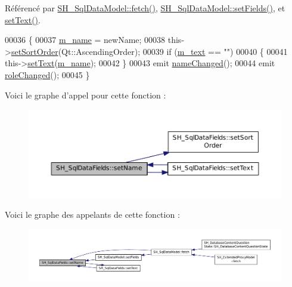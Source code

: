 Référencé par \hyperlink{classSH__SqlDataModel_ab6c206088250a66ddc8cb8d33a38e421}{S\-H\-\_\-\-Sql\-Data\-Model\-::fetch()}, \hyperlink{classSH__SqlDataModel_ad297d359375d55e66493ce8935f8ff05}{S\-H\-\_\-\-Sql\-Data\-Model\-::set\-Fields()}, et \hyperlink{classSH__SqlDataFields_ae098408de73ecbd532de8f44dea2b6d0}{set\-Text()}.


\begin{DoxyCode}
00036 \{
00037     \hyperlink{classSH__SqlDataFields_a3c0e82a8b6652335bdc53b211d39d4e2}{m\_name} = newName;
00038     this->\hyperlink{classSH__SqlDataFields_a32a7c040a081d39594245e1a4a68f70d}{setSortOrder}(Qt::AscendingOrder);
00039     \textcolor{keywordflow}{if} (\hyperlink{classSH__SqlDataFields_a55352d3aea0863fcab26c948babe8523}{m\_text} == \textcolor{stringliteral}{""})
00040     \{
00041         this->\hyperlink{classSH__SqlDataFields_ae098408de73ecbd532de8f44dea2b6d0}{setText}(\hyperlink{classSH__SqlDataFields_a3c0e82a8b6652335bdc53b211d39d4e2}{m\_name});
00042     \}
00043     emit \hyperlink{classSH__SqlDataFields_a2769afd59dde74e989bc28ed98bb04d8}{nameChanged}();
00044     emit \hyperlink{classSH__SqlDataFields_a6059e1ea44ad77f9b7b92e3c5e0da99c}{roleChanged}();
00045 \}
\end{DoxyCode}


Voici le graphe d'appel pour cette fonction \-:\nopagebreak
\begin{figure}[H]
\begin{center}
\leavevmode
\includegraphics[width=350pt]{classSH__SqlDataFields_a8d7b864a4ad5513af9e4c47a0d9919e8_cgraph}
\end{center}
\end{figure}




Voici le graphe des appelants de cette fonction \-:\nopagebreak
\begin{figure}[H]
\begin{center}
\leavevmode
\includegraphics[width=350pt]{classSH__SqlDataFields_a8d7b864a4ad5513af9e4c47a0d9919e8_icgraph}
\end{center}
\end{figure}


